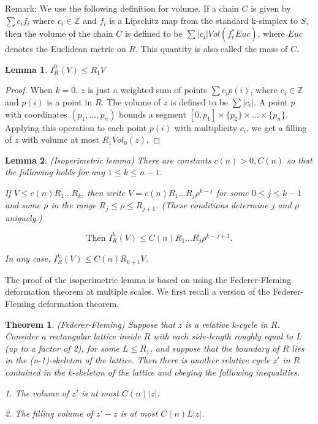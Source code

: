 \documentclass{amsart}
\newtheorem{theorem}{Theorem}
\newtheorem*{theorem 1}{Theorem 1}
\newtheorem*{theorem 2}{Theorem 2}
\newtheorem*{theorem 3}{Theorem 3}
\newtheorem{lemma}{Lemma}[section]
\numberwithin{equation}{section}
\begin{document}
Remark: We use the following definition for volume.  If a chain
$C$ is given by $\sum c_i f_i$ where $c_i \in \mathbb{Z}$ and
$f_i$ is a Lipschitz map from the standard k-simplex to $S$, then
the volume of the chain $C$ is defined to be $\sum |c_i|
Vol(f_i^* Euc)$, where $Euc$ denotes the Euclidean metric on $R$. 
This quantity is also called the mass of $C$.  

\begin{lemma} \label{isoperimetriclemma0}
$I_R^0(V) \le R_1 V$
\end{lemma}

\begin{proof} When $k=0$, $z$ is just a weighted sum of
points $\sum c_i p(i)$, where $c_i \in \mathbb{Z}$ and $p(i)$ is
a point in $R$.  The volume of $z$ is defined to be $\sum |c_i|$. 
A point $p$ with coordinates $(p_1, ..., p_n)$ bounds a segment
$[0, p_1] \times \{ p_2 \} \times ... \times \{ p_n \}$. 
Applying this operation to each point $p(i)$ with multiplicity
$c_i$, we get a filling of $z$ with volume at most $R_1 Vol_0(z)$.
\end{proof}


\begin{lemma} \label{isoperimetriclemma} (Isoperimetric lemma) There are constants $c(n) > 0, C(n)$ so that the
following holds for any $1 \le k \le n-1$.

If $V \le c(n) R_1 ... R_k$, then write $V = c(n) R_1 ... R_j
\rho^{k-j}$ for some $0 \le j \le k-1$ and some $\rho$ in the
range $R_j \le \rho \le R_{j+1}$. (These conditions determine $j$
and $\rho$ uniquely.)

$$\textrm{Then } I^k_R(V) \le C(n) R_1 ... R_j \rho^{k-j+1}.$$

In any case, $I^k_R(V) \le C(n) R_{k+1} V$.

\end{lemma}

The proof of the isoperimetric lemma is based on using the Federer-Fleming deformation theorem at multiple scales.  We first recall a version of the Federer-Fleming deformation theorem.  


\begin{theorem} \label{FF} (Federer-Fleming) Suppose that $z$ is a relative k-cycle in $R$.
Consider a rectangular lattice inside $R$ with each side-length
roughly equal to $L$ (up to a factor of 2), for some $L \le R_1$,
and suppose that the boundary of $R$ lies in the (n-1)-skeleton
of the lattice.  Then there is another relative cycle $z'$ in $R$
contained in the k-skeleton of the lattice and obeying the 
following inequalities.

1. The volume of $z'$ is at most $C(n) |z|$.

2. The filling volume of $z' - z$ is at most $C(n) L |z|$.

\end{theorem}
\end{document}
